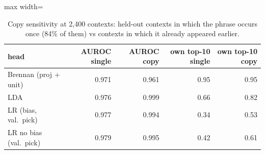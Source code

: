 \begin{table}[t]
\centering
\footnotesize
\caption{Copy sensitivity at 2{,}400 contexts: held-out contexts in which the phrase occurs once (84\% of them) vs contexts in which it already appeared earlier.}
\label{tab:bench_copy}
\begin{adjustbox}{max width=\textwidth}
\begin{tabular}{lrrrr}
\toprule
head & AUROC single & AUROC copy & own top-10 single & own top-10 copy \\
\midrule
Brennan (proj + unit) & 0.971 & 0.961 & 0.95 & 0.95 \\
LDA & 0.976 & 0.999 & 0.66 & 0.82 \\
LR (bias, val.\ pick) & 0.977 & 0.994 & 0.34 & 0.53 \\
LR no bias (val.\ pick) & 0.979 & 0.995 & 0.42 & 0.61 \\
\bottomrule
\end{tabular}
\end{adjustbox}
\end{table}
